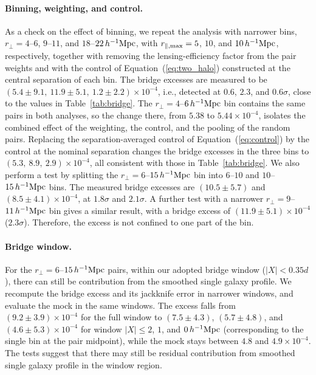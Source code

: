\documentclass[twocolumn,anonymous,linenumbers]{aastex701}
\newcommand{\hinvMpc}{h^{-1}{\rm Mpc}}
\begin{document}
\paragraph{Binning, weighting, and control.} 
As a check on the effect of binning, we repeat the analysis with narrower bins, $r_\perp=4$--$6$, $9$--$11$, and
$18$--$22\,\hinvMpc$, with $r_{\parallel,{\rm max}}=5$, $10$, and
$10\,\hinvMpc$, respectively, together with removing the lensing-efficiency factor from the pair weights and with the
control of Equation~(\ref{eq:two_halo}) constructed at the central separation of each bin. The bridge excesses are measured to be $\left(5.4\pm9.1,\ 11.9\pm5.1,\ 1.2\pm2.2\right)\times10^{-4}$, i.e., detected at $0.6$,
$2.3$, and $0.6\sigma$, close to the values in Table~\ref{tab:bridge}. 
The $r_\perp=4$--$6\,\hinvMpc$ bin contains the same pairs in both analyses, so the change there, from $5.38$ to $5.44\times10^{-4}$, isolates the combined effect of the
weighting, the control, and the pooling of the random pairs. 
Replacing the separation-averaged control of Equation~(\ref{eq:control}) by the control at
the nominal separation changes the bridge excesses in the three bins to $\left(5.3,\ 8.9,\ 2.9\right)\times10^{-4}$, all consistent with those in Table~\ref{tab:bridge}. 
We also perform a test by splitting the
$r_\perp=6$--$15\,\hinvMpc$ bin into $6$--$10$ and $10$--$15\,\hinvMpc$ bins. The measured bridge excesses are $(10.5\pm5.7)$ and $(8.5\pm4.1)\times10^{-4}$, at $1.8\sigma$ and $2.1\sigma$. A further test with a narrower $r_\perp=9$--$11\,\hinvMpc$ bin gives a similar result, with a bridge excess of
$(11.9\pm5.1)\times10^{-4}$ ($2.3\sigma$).
Therefore, the excess is not confined to one part of the bin. 

\paragraph{Bridge window.} 
For the $r_\perp=6$--$15\,\hinvMpc$ pairs, within our adopted bridge window ($|X|<0.35d$), there can still be contribution from the smoothed single galaxy profile. We recompute the bridge excess and its jackknife error in narrower windows, and evaluate
the mock in the same windows. The excess falls from $(9.2\pm3.9)\times10^{-4}$ for the full window to $(7.5\pm4.3)$,
$(5.7\pm4.8)$, and $(4.6\pm5.3)\times10^{-4}$ for window $|X|\leq2$, $1$, and $0\,\hinvMpc$ (corresponding to the single bin at the pair midpoint), while the mock stays between $4.8$ and $4.9\times10^{-4}$. The tests suggest that there may still be residual contribution from smoothed single galaxy profile in the window region.
\end{document}
